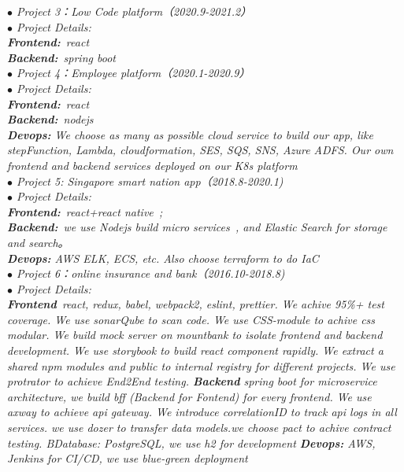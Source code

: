 \documentclass[a3paper,12pt,final]{memoir}
\begin{document}
\begin{CJK*}{UTF8}{gbsn}
\textit{$\bullet$ Project 3：Low Code platform（2020.9-2021.2）}\\
\textit{$\bullet$ Project Details: \\\textbf{Frontend:}~react~ \\
  \textbf{Backend:}~spring boot~ }\\


\textit{$\bullet$ Project 4：Employee platform（2020.1-2020.9）} \\
\textit{$\bullet$ Project Details: \\\textbf{Frontend:}~react~ \\
  \textbf{Backend:}~nodejs~ \\
  \textbf{Devops:} We choose as many as possible cloud service to build our app, like stepFunction, Lambda, cloudformation, SES, SQS, SNS, Azure ADFS. Our own frontend and backend services deployed on our K8s platform}\\


\textit{$\bullet$ Project 5: Singapore smart nation app（2018.8-2020.1)} \\
\textit{$\bullet$ Project Details: \\\textbf{Frontend:}~react+react native~; \\
  \textbf{Backend:}~we use Nodejs build micro services~, and Elastic Search for storage and search。\\
  \textbf{Devops:} AWS ELK, ECS, etc. Also choose terraform to do IaC~} \\


\textit{$\bullet$ Project 6：online insurance and bank（2016.10-2018.8)} \\
\textit{$\bullet$ Project Details: \\\textbf{Frontend}~react, redux, babel, webpack2, eslint, prettier.
  We achive 95\%+ test coverage.
  We use sonarQube to scan code.
  We use CSS-module to achive css modular.
  We build mock server on mountbank to isolate frontend and backend development.
  We use storybook to build react component rapidly.
  We extract a shared npm modules and public to internal registry for different projects.
  We use protrator to achieve End2End testing.
  \textbf{Backend} spring boot for microservice architecture, we build bff (Backend for Fontend) for every frontend. We use axway to achieve api gateway. We introduce correlationID to track api logs in all services. we use dozer to transfer data models.we choose pact to achive contract testing.
  B{Database}: PostgreSQL, we use h2 for development
  \textbf{Devops:} AWS, Jenkins for CI/CD, we use blue-green deployment } \\


\end{CJK*}
\end{document}
